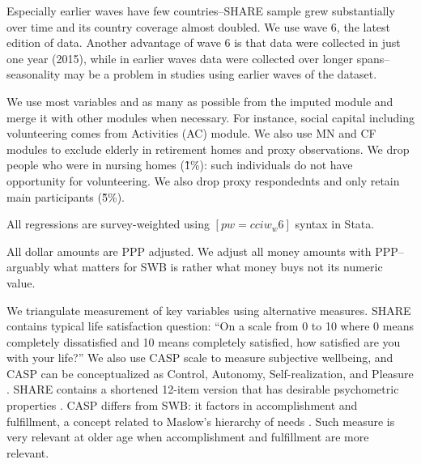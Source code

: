 \documentclass[10pt, letterpaper]{article}
\begin{document}
\begin{spacing}{1.4}
Especially earlier waves have few countries--SHARE sample grew substantially
over time and its country coverage almost doubled.
We use  wave 6, the latest edition of data. Another advantage of wave 6 is that
data were collected in just one year (2015), %
while in earlier waves data were collected over longer spans--seasonality may be
a problem in studies using earlier waves of the dataset.

We use most variables and as many as possible from the  imputed module and merge
it with other modules when necessary. For instance, social capital including
volunteering comes from Activities (AC) module. We also use MN and CF modules to
exclude elderly in retirement homes and proxy observations.
%
We drop people who were in nursing homes (\~ 1\%): such individuals do not have
opportunity for volunteering. We also drop proxy respondednts and only retain
main participants (\~ 5\%). %


All regressions are survey-weighted using $[pw=cciw_w6]$ syntax in Stata.

All dollar amounts are PPP adjusted. We adjust all money amounts with
PPP--arguably what matters for SWB is rather what money buys not its numeric value.

We triangulate measurement of key variables using alternative  measures. 
SHARE contains typical life satisfaction question: %
``On a scale from 0 to 10 where 0 means completely dissatisfied and 10 means
completely satisfied, how satisfied
are you with your life?'' We also use CASP scale to measure subjective
wellbeing, and CASP can be conceptualized as Control, Autonomy,
Self-realization, and Pleasure \citep{hyde2003measure}. SHARE contains a shortened 12-item version that has
desirable psychometric properties \citep{knesbeck2005quality}. CASP differs from
SWB: it factors in accomplishment and fulfillment, a concept related to Maslow's
hierarchy of needs \citep{maslow87}. Such measure is  very relevant at older age
when accomplishment and fulfillment are more relevant. %


\end{spacing}
\end{document}
